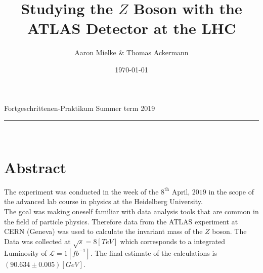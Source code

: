 \documentclass[12pt, a4paper, bibliography=totoc]{scrartcl}
\title{Studying the $Z$ Boson with the ATLAS Detector at the LHC}
\author{Aaron Mielke \& Thomas Ackermann}
\date{\today}
\begin{document}
\begin{center}
	\makeatletter
	\thispagestyle{empty}
	\large{Fortgeschrittenen-Praktikum}
\hfill
	 \vspace{-5mm}
    \large{Summer term 2019} 
    \rule{\textwidth}{0.2pt}
    \Huge\textbf{\@title} \\
	\large{\@author}
	\makeatother
\end{center}
\section*{Abstract}
The experiment was conducted in the week of the $8^\text{th}$ April, $2019$ in the scope of the advanced lab course in physics at the Heidelberg University. \\
The goal was making oneself familiar with data analysis tools that are common in the field of particle physics.
Therefore data from the ATLAS experiment at CERN (Geneva) was used to calculate the invariant mass of the $Z$ boson.
The Data was collected at $\sqrt{s} = 8 \si{[TeV]}$ which corresponds to a integrated Luminosity of $\mathcal{L} = 1 \si{[fb^{-1}]}$.
The final estimate of the calculations is $(90.634 \pm 0.005 )\si{[GeV]}$.
\tableofcontents
\newpage
\end{document}

